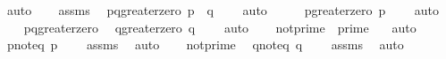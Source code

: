 \begin{isabellebody}
\ auto\isanewline
\isanewline
\ \ \isamarkupfalse%
\ assms{\isacharparenleft}{\kern0pt}{}{\isacharcomma}{\kern0pt}{}{\isacharcomma}{\kern0pt}{}{\isacharcomma}{\kern0pt}{}{\isacharparenright}{\kern0pt}\ \isamarkupfalse%
\ pq{\isacharunderscore}{\kern0pt}greater{\isacharunderscore}{\kern0pt}zero{\isacharcolon}{\kern0pt}\ {\isachardoublequoteopen}p\ {\isacharasterisk}{\kern0pt}\ q\ {\isachargreater}{\kern0pt}\ {}{\isachardoublequoteclose}\ \isamarkupfalse%
\ auto\isanewline
\ \ \isamarkupfalse%
\ \isamarkupfalse%
\ p{\isacharunderscore}{\kern0pt}greater{\isacharunderscore}{\kern0pt}zero{\isacharcolon}{\kern0pt}\ {\isachardoublequoteopen}p\ {\isachargreater}{\kern0pt}\ {}{\isachardoublequoteclose}\ \isamarkupfalse%
\ auto\isanewline
\ \ \isamarkupfalse%
\ pq{\isacharunderscore}{\kern0pt}greater{\isacharunderscore}{\kern0pt}zero\ \isamarkupfalse%
\ q{\isacharunderscore}{\kern0pt}greater{\isacharunderscore}{\kern0pt}zero{\isacharcolon}{\kern0pt}\ {\isachardoublequoteopen}q\ {\isachargreater}{\kern0pt}\ {}{\isachardoublequoteclose}\ \isamarkupfalse%
\ auto\isanewline
\isanewline
\ \ \isamarkupfalse%
\ not{\isacharunderscore}{\kern0pt}prime{\isacharunderscore}{\kern0pt}{}{\isacharcolon}{\kern0pt}\ {\isachardoublequoteopen}{\isasymnot}\ prime\ {}{\isachardoublequoteclose}\ \isamarkupfalse%
\ auto\isanewline
\ \ \isamarkupfalse%
\ \isamarkupfalse%
\ p{\isacharunderscore}{\kern0pt}noteq{\isacharunderscore}{\kern0pt}{}{\isacharcolon}{\kern0pt}\ {\isachardoublequoteopen}p\ {\isasymnoteq}\ {}{\isachardoublequoteclose}\ \isamarkupfalse%
\ assms{\isacharparenleft}{\kern0pt}{}{\isacharparenright}{\kern0pt}\ \isamarkupfalse%
\ auto\isanewline
\ \ \isamarkupfalse%
\ not{\isacharunderscore}{\kern0pt}prime{\isacharunderscore}{\kern0pt}{}\ \isamarkupfalse%
\ q{\isacharunderscore}{\kern0pt}noteq{\isacharunderscore}{\kern0pt}{}{\isacharcolon}{\kern0pt}\ {\isachardoublequoteopen}q\ {\isasymnoteq}\ {}{\isachardoublequoteclose}\ \isamarkupfalse%
\ assms{\isacharparenleft}{\kern0pt}{}{\isacharparenright}{\kern0pt}\ \isamarkupfalse%
\ auto\isanewline
\ \ \isamarkupfalse%

\end{isabellebody}
